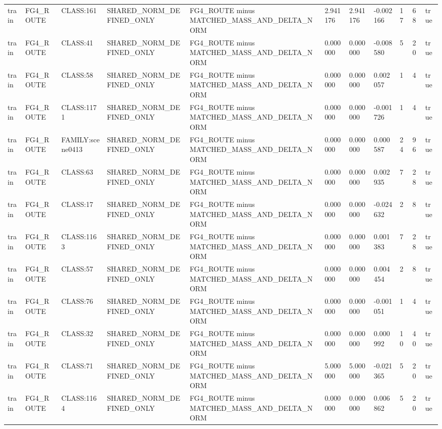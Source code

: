 \begin{tabular}{lllllllllll}
train & FG4\_ROUTE & CLASS:161 & SHARED\_NORM\_DEFINED\_ONLY & FG4\_ROUTE minus MATCHED\_MASS\_AND\_DELTA\_NORM & 2.941176 & 2.941176 & -0.002166 & 17 & 68 & true \\
train & FG4\_ROUTE & CLASS:41 & SHARED\_NORM\_DEFINED\_ONLY & FG4\_ROUTE minus MATCHED\_MASS\_AND\_DELTA\_NORM & 0.000000 & 0.000000 & -0.008580 & 5 & 20 & true \\
train & FG4\_ROUTE & CLASS:58 & SHARED\_NORM\_DEFINED\_ONLY & FG4\_ROUTE minus MATCHED\_MASS\_AND\_DELTA\_NORM & 0.000000 & 0.000000 & 0.002057 & 1 & 4 & true \\
train & FG4\_ROUTE & CLASS:1171 & SHARED\_NORM\_DEFINED\_ONLY & FG4\_ROUTE minus MATCHED\_MASS\_AND\_DELTA\_NORM & 0.000000 & 0.000000 & -0.001726 & 1 & 4 & true \\
train & FG4\_ROUTE & FAMILY:scene0413 & SHARED\_NORM\_DEFINED\_ONLY & FG4\_ROUTE minus MATCHED\_MASS\_AND\_DELTA\_NORM & 0.000000 & 0.000000 & 0.000587 & 24 & 96 & true \\
train & FG4\_ROUTE & CLASS:63 & SHARED\_NORM\_DEFINED\_ONLY & FG4\_ROUTE minus MATCHED\_MASS\_AND\_DELTA\_NORM & 0.000000 & 0.000000 & 0.002935 & 7 & 28 & true \\
train & FG4\_ROUTE & CLASS:17 & SHARED\_NORM\_DEFINED\_ONLY & FG4\_ROUTE minus MATCHED\_MASS\_AND\_DELTA\_NORM & 0.000000 & 0.000000 & -0.024632 & 2 & 8 & true \\
train & FG4\_ROUTE & CLASS:1163 & SHARED\_NORM\_DEFINED\_ONLY & FG4\_ROUTE minus MATCHED\_MASS\_AND\_DELTA\_NORM & 0.000000 & 0.000000 & 0.001383 & 7 & 28 & true \\
train & FG4\_ROUTE & CLASS:57 & SHARED\_NORM\_DEFINED\_ONLY & FG4\_ROUTE minus MATCHED\_MASS\_AND\_DELTA\_NORM & 0.000000 & 0.000000 & 0.004454 & 2 & 8 & true \\
train & FG4\_ROUTE & CLASS:76 & SHARED\_NORM\_DEFINED\_ONLY & FG4\_ROUTE minus MATCHED\_MASS\_AND\_DELTA\_NORM & 0.000000 & 0.000000 & -0.001051 & 1 & 4 & true \\
train & FG4\_ROUTE & CLASS:32 & SHARED\_NORM\_DEFINED\_ONLY & FG4\_ROUTE minus MATCHED\_MASS\_AND\_DELTA\_NORM & 0.000000 & 0.000000 & 0.000992 & 10 & 40 & true \\
train & FG4\_ROUTE & CLASS:71 & SHARED\_NORM\_DEFINED\_ONLY & FG4\_ROUTE minus MATCHED\_MASS\_AND\_DELTA\_NORM & 5.000000 & 5.000000 & -0.021365 & 5 & 20 & true \\
train & FG4\_ROUTE & CLASS:1164 & SHARED\_NORM\_DEFINED\_ONLY & FG4\_ROUTE minus MATCHED\_MASS\_AND\_DELTA\_NORM & 0.000000 & 0.000000 & 0.006862 & 5 & 20 & true \\

\end{tabular}
